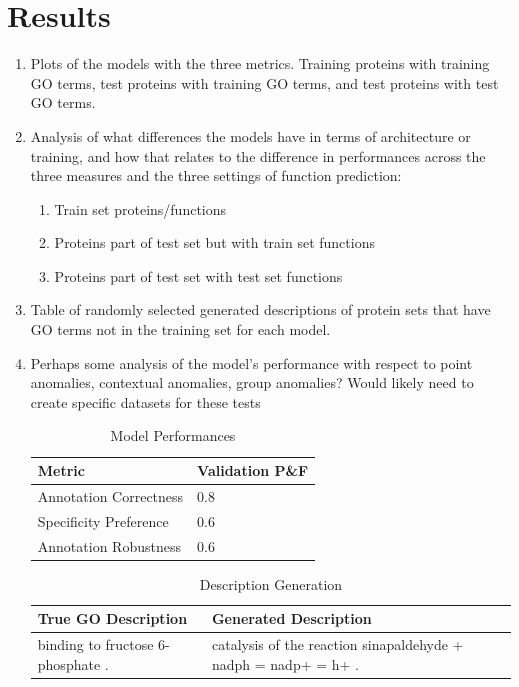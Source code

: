 \documentclass{specification}
\begin{document}
\section{Results}
\begin{enumerate}
    \item Plots of the models with the three metrics.
Training proteins with training GO terms, test proteins with training GO terms, and test proteins with test GO terms.
    \item Analysis of what differences the models have in terms of architecture or training, and how that relates to the difference in performances across the three measures and the three settings of function prediction:
        \begin{enumerate}
            \item Train set proteins/functions
            \item Proteins part of test set but with train set functions
            \item Proteins part of test set with test set functions
        \end{enumerate}
    \item Table of randomly selected generated descriptions of protein sets that have GO terms not in the training set for each model.
    \item Perhaps some analysis of the model's performance with respect to point anomalies, contextual anomalies, group anomalies? Would likely need to create specific datasets for these tests
\begin{table}
	\caption{Model Performances}
	\centering
	\begin{tabular}{l|l}
		\toprule
        Metric & Validation P\&F \\
		\midrule
        Annotation Correctness &  0.8 \\
        Specificity Preference &  0.6 \\
		Annotation Robustness &  0.6 \\
		\bottomrule
	\end{tabular}
	\label{tab:table}
\end{table}
\begin{table}
	\caption{Description Generation}
	\centering
    \begin{tabular}{p{7.5 cm}|p{7.5 cm}}
		\toprule
        True GO Description & Generated Description \\
		\midrule
        binding to fructose 6-phosphate . & catalysis of the reaction sinapaldehyde + nadph = nadp+ = h+ . \\ \hline

\end{tabular}
\end{table}
\end{enumerate}
\end{document}
